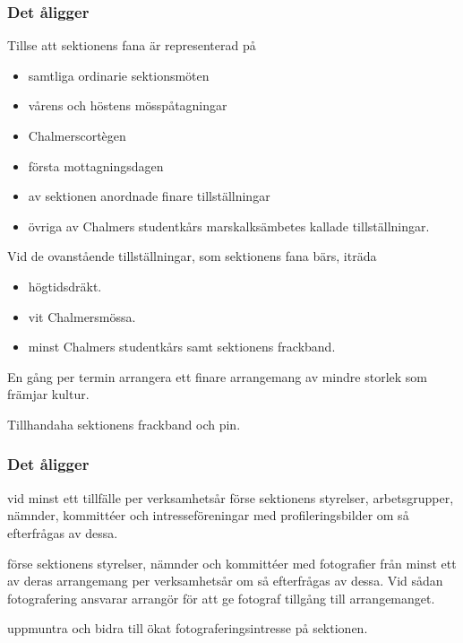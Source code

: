 \subsubsection{Det åligger \FANBARERIT}
\label{sec:fanbarerit:function}
\begin{att}
	\item Tillse att sektionens fana är representerad på
	\begin{itemize}
		\item samtliga ordinarie sektionsmöten
		\item vårens och höstens mösspåtagningar
		\item Chalmerscortègen
		\item första mottagningsdagen
		\item av sektionen anordnade finare tillställningar
		\item övriga av Chalmers studentkårs marskalksämbetes kallade tillställningar.
	\end{itemize}
	\item Vid de ovanstående tillställningar, som sektionens fana bärs, iträda
	\begin{itemize}
		\item högtidsdräkt.
		\item vit Chalmersmössa.
		\item minst Chalmers studentkårs samt sektionens frackband.
	\end{itemize}
	\item En gång per termin arrangera ett finare arrangemang av mindre storlek som främjar kultur.
	\item Tillhandaha sektionens frackband och pin.
\end{att}

\subsubsection{Det åligger \FLASHIT}
\begin{att}
	\item vid minst ett tillfälle per verksamhetsår förse sektionens styrelser, arbetsgrupper, nämnder, kommittéer och intresseföreningar med profileringsbilder om så efterfrågas av dessa.
	\item förse sektionens styrelser, nämnder och kommittéer med fotografier från minst ett av deras arrangemang per verksamhetsår om så efterfrågas av dessa. Vid sådan fotografering ansvarar arrangör för att ge fotograf tillgång till arrangemanget.
	\item uppmuntra och bidra till ökat fotograferingsintresse på sektionen.
\end{att}

